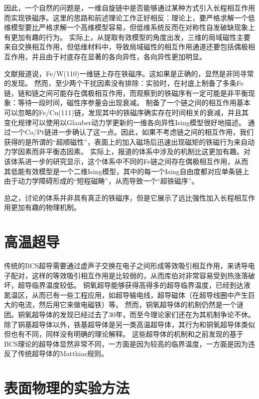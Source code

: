 \documentclass[hyperref, UTF8]{ctexart}
\begin{document}
因此，一个自然的问题是，一维自旋链中是否能够通过某种方式引入长程相互作用而实现铁磁序。这里的思路和前述理论工作正好相反：理论上，要严格求解一个低维模型要比严格求解一个高维模型容易，但低维系统反而在对称性自发破缺现象上有更加有趣的行为。
实际上，从提取有效模型的角度出发，三维的局域磁性主要来自交换相互作用，但低维材料中，导致局域磁性的相互作用通道还要包括偶极相互作用，并且由于衬底存在显著的各向异性，各向异性更加明显\cite{shen1997magnetism}。

文献\cite{PhysRevLett.73.898}报道说，Fe/W(110)一维链上存在铁磁序。这如果是正确的，显然是非同寻常的发现。
然而，至少两个干扰因素没有排除：实验时，在衬底上制备了多条Fe链，链和链之间可能存在偶极相互作用，而观察到的铁磁序有一定可能是非平衡现象：等待一段时间，磁性序参量会出现衰减。
\cite{shen1997magnetism}制备了一个链之间的相互作用基本可以忽略的Fe/Cu(111)链，发现其中的铁磁序确实存在时间相关的衰减，并且其变化规律可以使用以Glauber动力学更新的一维各向异性Ising模型很好地描述。
\cite{gambardella2002ferromagnetism}通过一个Co/Pt链进一步确认了这一点。因此，如果不考虑链之间的相互作用，我们获得的是所谓的“超顺磁性”，表面上的加入磁场后迅速出现磁矩的铁磁行为来自动力学因素而非平衡态因素。
实际上，\cite{PhysRevLett.73.898}报道的体系中涉及的机制比这更加有趣。对该体系进一步的研究\cite{PhysRevB.57.R677}显示，这个体系中不同的Fe链之间存在偶极相互作用，从而其低能有效模型是一个二维Ising模型，其中的每一个Ising自由度都对应单条链上由于动力学障碍形成的“短程磁畴”，从而导致一个“超铁磁序”。

总之，\cite{PhysRevLett.73.898}讨论的体系并非具有真正的铁磁序，但是它展示了远比强性加入长程相互作用更加有趣的物理机制。

\section{高温超导}

传统的BCS超导需要通过虚声子交换在电子之间形成等效吸引相互作用，来诱导电子配对，这样的等效吸引相互作用是比较弱的，从而库伯对非常容易受到热涨落破坏，超导临界温度较低。
铜氧超导能够获得高得多的超导临界温度，已经到达液氮温区，从而已有一些工程应用，如超导输电线，超导磁体（在超导线圈中产生巨大的电流，然后用它来做电磁铁）等。
然而，铜氧超导体的机制仍然是一个谜团。铜氧超导体的发现已经过去了30年，而至今理论家们还在为其机制争论不休。
除了铜基超导体以外，铁基超导体是另一类高温超导体，其行为和铜氧超导体类似但也有不同，同样没有明确的理论解释。
这些超导体的机制和之前发现的基于BCS理论的超导体显然非常不同，一方面是因为较高的临界温度，一方面是因为违反了传统超导体的Matthias规则\cite{Conder_2016}。

\section{表面物理的实验方法}



\end{document}
